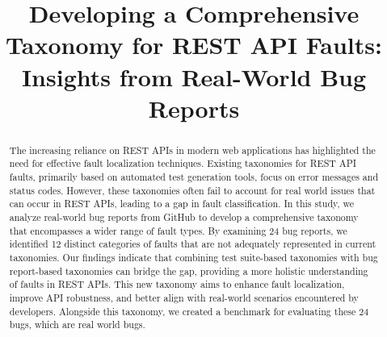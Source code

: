 \documentclass[conference]{IEEEtran}
\begin{document}
\title{Developing a Comprehensive Taxonomy for REST API Faults: Insights from Real-World Bug Reports}

\author{
\and
{}
\and
{}
}

\maketitle

\begin{abstract}
    The increasing reliance on REST APIs in modern web applications has highlighted the need for effective fault localization techniques. 
    Existing taxonomies for REST API faults, primarily based on automated test generation tools, focus on error messages and status codes. 
    However, these taxonomies often fail to account for real world issues that can occur in REST APIs, leading to a gap in fault classification. 
    In this study, we analyze real-world bug reports from GitHub to develop a comprehensive taxonomy that encompasses a wider range of fault types. 
    By examining 24 bug reports, we identified 12 distinct categories of faults that are not adequately represented in current taxonomies. 
    Our findings indicate that combining test suite-based taxonomies with bug report-based taxonomies can bridge the gap, providing a more holistic understanding of faults in REST APIs. 
    This new taxonomy aims to enhance fault localization, improve API robustness, and better align with real-world scenarios encountered by developers.
    Alongside this taxonomy, we created a benchmark for evaluating these 24 bugs, which are real world bugs. \\
\end{abstract}
\end{document}
